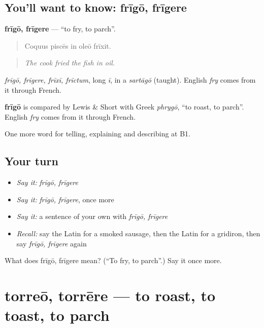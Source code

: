 \subsection*{You'll want to know: frīgō, frīgere}
\textbf{frīgō, frīgere} — \textquotedblleft{}to fry, to parch\textquotedblright{}.

\begin{quote}
Coquus piscēs in oleō frīxit.
\end{quote}

\begin{quote}
\emph{The cook fried the fish in oil.}
\end{quote}

\emph{frīgō, frīgere, frīxī, frīctum}, long \emph{ī}, in a \emph{sartāgō} (taught). English \emph{fry} comes from it through French.

\begin{cousinweb}
\textbf{frīgō} is compared by Lewis \& Short with Greek \emph{phrygō}, \textquotedblleft{}to roast, to parch\textquotedblright{}. English \emph{fry} comes from it through French.
\end{cousinweb}

\begin{grammarlens}[title={What you've built}]
One more word for telling, explaining and describing at B1.
\end{grammarlens}

\subsection*{Your turn}
\begin{itemize}
\raggedright
  \item \emph{Say it:} \emph{frīgō, frīgere}
  \item \emph{Say it:} \emph{frīgō, frīgere}, once more
  \item \emph{Say it:} a sentence of your own with \emph{frīgō, frīgere}
  \item \emph{Recall:} say the Latin for a smoked sausage, then the Latin for a gridiron, then say \emph{frīgō, frīgere} again
\end{itemize}

\begin{tcolorbox}[breakable,colback=teal!4,colframe=teal!35!black,title={Before you move on}]
What does frīgō, frīgere mean? (\textquotedblleft{}To fry, to parch\textquotedblright{}.) Say it once more.
\end{tcolorbox}
\section[torreō, torrēre]{torreō, torrēre — to roast, to toast, to parch}

